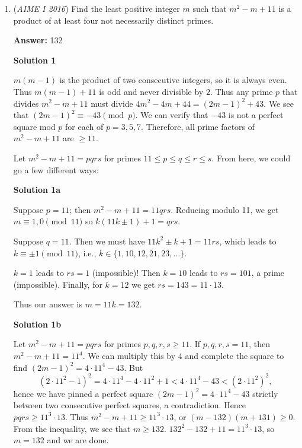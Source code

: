 \begin{enumerate}
 \textbf{Note(Key Idea)} Their are a couple of solution methods such as constant $n$th differences and using intuition on the roots. But the main idea in this problem was the fact that, $P(\frac{7}{2})$ is hard to get by itself, cause we can only find the output for integral input values from the information we have. This is crucial as it helps solves this mischievous problem.

 Thus, we can solve for $P(x)$, and this is best approached by finding its roots.

 
== See also 

 


	\item (\textit{AIME I 2016}) Find the least positive integer $m$ such that $m^2 - m + 11$ is a product of at least four not necessarily distinct primes. 


 
 \textbf{Answer: }132



\textbf{Solution 1}

$m(m-1)$ is the product of two consecutive integers, so it is always even. Thus $m(m-1)+11$ is odd and never divisible by $2$. Thus any prime $p$ that divides $m^2-m+11$ must divide $4m^2-4m+44=(2m-1)^2+43$. We see that $(2m-1)^2\equiv -43\pmod{p}$. We can verify that $-43$ is not a perfect square mod $p$ for each of $p=3,5,7$. Therefore, all prime factors of $m^2-m+11$ are $\ge 11$.

 Let $m^2 - m + 11 = pqrs$ for primes $11\le p \le q \le r \le s$. From here, we could go a few different ways:

 



\textbf{Solution 1a}

Suppose $p=11$; then $m^2-m+11=11qrs$. Reducing modulo 11, we get $m\equiv  1,0 \pmod{11}$ so $k(11k\pm 1)+1 = qrs$. 

 Suppose $q=11$. Then we must have $11k^2\pm k + 1 = 11rs$, which leads to $k\equiv \pm 1 \pmod{11}$, i.e., $k\in \{1,10,12,21,23,\ldots\}$. 

 $k=1$ leads to $rs=1$ (impossible)! Then $k=10$ leads to $rs=101$, a prime (impossible). Finally, for $k=12$ we get $rs=143=11\cdot 13$. 

 Thus our answer is $m=11k= \boxed{132}$.

 



\textbf{Solution 1b}

Let $m^2 - m + 11 = pqrs$ for primes $p, q, r, s\ge11$. If $p, q, r, s = 11$, then $m^2-m+11=11^4$. We can multiply this by $4$ and complete the square to find $(2m-1)^2=4\cdot 11^4-43$. But 
 \[(2\cdot 11^2-1)^2=4\cdot 11^4-4\cdot 11^2+1 <4\cdot 11^4-43<(2\cdot 11^2)^2,\]hence we have pinned a perfect square $(2m-1)^2=4\cdot 11^4-43$ strictly between two consecutive perfect squares, a contradiction. Hence $pqrs \ge 11^3 \cdot 13$. Thus $m^2-m+11\ge 11^3\cdot 13$, or $(m-132)(m+131)\ge0$. From the inequality, we see that $m \ge 132$. $132^2 - 132 + 11 = 11^3 \cdot 13$, so $m = \boxed{132}$ and we are done.


\end{enumerate}
